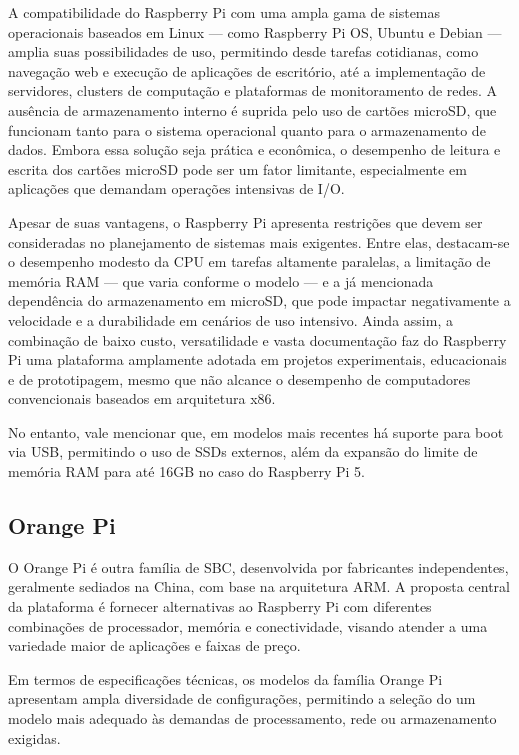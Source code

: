 A compatibilidade do Raspberry Pi com uma ampla gama de sistemas operacionais baseados em Linux — como Raspberry Pi OS, Ubuntu e Debian — amplia suas possibilidades de uso, permitindo desde tarefas cotidianas, como navegação web e execução de aplicações de escritório, até a implementação de servidores, clusters de computação e plataformas de monitoramento de redes. A ausência de armazenamento interno é suprida pelo uso de cartões microSD, que funcionam tanto para o sistema operacional quanto para o armazenamento de dados. Embora essa solução seja prática e econômica, o desempenho de leitura e escrita dos cartões microSD pode ser um fator limitante, especialmente em aplicações que demandam operações intensivas de I/O.

Apesar de suas vantagens, o Raspberry Pi apresenta restrições que devem ser consideradas no planejamento de sistemas mais exigentes. Entre elas, destacam-se o desempenho modesto da CPU em tarefas altamente paralelas, a limitação de memória RAM — que varia conforme o modelo — e a já mencionada dependência do armazenamento em microSD, que pode impactar negativamente a velocidade e a durabilidade em cenários de uso intensivo. Ainda assim, a combinação de baixo custo, versatilidade e vasta documentação faz do Raspberry Pi uma plataforma amplamente adotada em projetos experimentais, educacionais e de prototipagem, mesmo que não alcance o desempenho de computadores convencionais baseados em arquitetura x86.

No entanto, vale mencionar que, em modelos mais recentes há suporte para boot via USB, permitindo o uso de SSDs externos, além da expansão do limite de memória RAM para até 16GB no caso do Raspberry Pi 5. 

\subsection{Orange Pi}
\label{subsection:OrangePi}

O Orange Pi é outra família de SBC, desenvolvida por fabricantes independentes, geralmente sediados na China, com base na arquitetura ARM. A proposta central da plataforma é fornecer alternativas ao Raspberry Pi com diferentes combinações de processador, memória e conectividade, visando atender a uma variedade maior de aplicações e faixas de preço.

Em termos de especificações técnicas, os modelos da família Orange Pi apresentam ampla diversidade de configurações, permitindo a seleção do um modelo mais adequado às demandas de processamento, rede ou armazenamento exigidas.

